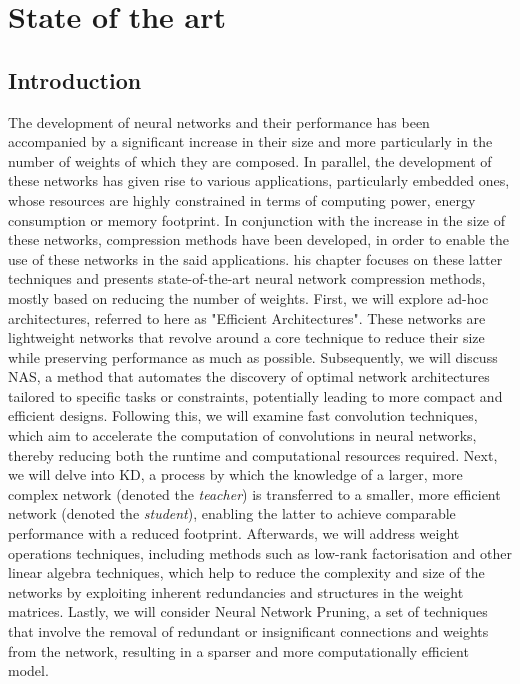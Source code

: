 \chapter{State of the art}
\label{chap:sota}


\localtableofcontents


\section{Introduction}
The development of neural networks and their performance has been accompanied by
a significant increase in their size and more particularly in the number of
weights of which they are composed. In parallel, the development of these
networks has given rise to various applications, particularly embedded ones,
whose resources are highly constrained in terms of computing power, energy
consumption or memory footprint. In conjunction with the increase in the size of
these networks, compression methods have been developed, in order to enable the
use of these networks in the said applications. his chapter focuses on these
latter techniques and presents state-of-the-art neural network compression
methods, mostly based on reducing the number of weights. First, we will explore
ad-hoc architectures, referred to here as "Efficient Architectures". These
networks are lightweight networks that revolve around a core technique to reduce
their size while preserving performance as much as possible. Subsequently, we
will discuss \ac{NAS}, a method that automates the discovery of optimal network
architectures tailored to specific tasks or constraints, potentially leading to
more compact and efficient designs. Following this, we will examine fast
convolution techniques, which aim to accelerate the computation of convolutions
in neural networks, thereby reducing both the runtime and computational
resources required. Next, we will delve into \ac{KD}, a process by which the
knowledge of a larger, more complex network (denoted the \emph{teacher}) is
transferred to a smaller, more efficient network (denoted the \emph{student}),
enabling the latter to achieve comparable performance with a reduced footprint.
Afterwards, we will address weight operations techniques, including methods such
as low-rank factorisation and other linear algebra techniques, which help to
reduce the complexity and size of the networks by exploiting inherent
redundancies and structures in the weight matrices. Lastly, we will consider
Neural Network Pruning, a set of techniques that involve the removal of
redundant or insignificant connections and weights from the network, resulting
in a sparser and more computationally efficient model.\\

